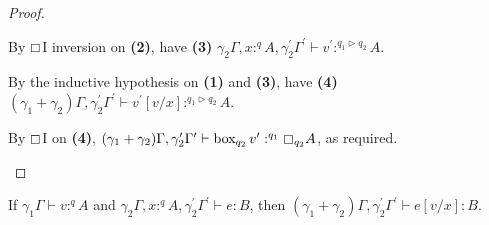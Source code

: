 \documentclass[acmsmall,screen,nonacm]{acmart}
\DeclareMathOperator{\bbox}{\text{box}}
\newcommand{\tee}{\vdash}
\DeclareMathOperator{\boxop}{\mathbin{\triangleright}}
\begin{document}
\begin{proof}
\begin{description}
    By $\boxempty$I inversion on \textbf{(2)}, have \textbf{(3)} $\gamma_2\Gamma, x :^q A, \gamma_2^\prime\Gamma^\prime \tee v^\prime :^{q_1 \boxop q_2} A$.

    By the inductive hypothesis on \textbf{(1)} and \textbf{(3)}, have \textbf{(4)} $(\gamma_1 + \gamma_2)\Gamma, \gamma_2^\prime\Gamma^\prime \tee v^\prime[v/x] :^{q_1 \boxop q_2} A$.

    By $\boxempty$I on \textbf{(4)}, $(\gamma_1 + \gamma_2)\Gamma, \gamma_2^\prime\Gamma^\prime \tee \bbox_{q_2} v^\prime :^{q_1} \boxempty_{q_2} A$, as required.
  \end{description}
\end{proof}

\begin{lemma}
\label{lem:new-modal-forward-substitution-exprs}
  If $\gamma_1\Gamma \tee v :^q A$ and $\gamma_2\Gamma, x :^q A, \gamma_2^\prime\Gamma^\prime \tee e : B$, then $(\gamma_1 + \gamma_2)\Gamma, \gamma_2^\prime\Gamma^\prime \tee e[v/x] : B$.
\end{lemma}
\end{document}
